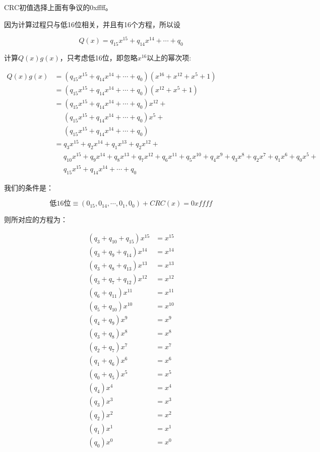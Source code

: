 \documentclass[
]{article}
\begin{document}
CRC初值选择上面有争议的0xffff。

因为计算过程只与低16位相关，并且有16个方程，所以设

\begin{equation}
Q(x)=q_{15}x^{15}+q_{14}x^{14}+\cdots+q_0
\end{equation}

计算$Q(x)g(x)$，只考虑低16位，即忽略$x^{16}以上的幂次项$:

\begin{equation}
\begin{aligned}
Q(x)g(x)&=(q_{15}x^{15}+q_{14}x^{14}+\cdots+q_0)(x^{16}+x^{12}+x^5+1)\\
&=(q_{15}x^{15}+q_{14}x^{14}+\cdots+q_0)(x^{12}+x^5+1)\\
&=(q_{15}x^{15}+q_{14}x^{14}+\cdots+q_0)x^{12} +\\
& \: \: \: \: \: \:(q_{15}x^{15}+q_{14}x^{14}+\cdots+q_0)x^5 +\\
& \: \: \: \: \: \:(q_{15}x^{15}+q_{14}x^{14}+\cdots+q_0)\\
&=q_3x^{15}+q_2x^{14}+q_1x^{13}+q_2x^{12}+\\
& \: \: \: \: \: \: q_{10}x^{15}+q_9x^{14}+q_8x^{13}+q_7x^{12}+q_6x^{11}+q_5x^{10}+q_4x^{9}+q_3x^{8}+q_2x^{7}+q_1x^{6}+q_0x^{5}+\\
& \: \: \: \: \: \: q_{15}x^{15}+q_{14}x^{14}+\cdots+q_0
\end{aligned}
\end{equation}

我们的条件是：

\begin{equation}
[Q(x)g(x)]低16位 \equiv (0_{15},0_{14},\cdots,0_1,0_0)+CRC(x)=0xffff
\end{equation}

则所对应的方程为：

\begin{equation}
\begin{aligned}
(q_{3}+q_{10}+q_{15})x^{15}&=x^{15}\\
(q_{3}+q_{ 9}+q_{14})x^{14}&=x^{14}\\
(q_{3}+q_{ 8}+q_{13})x^{13}&=x^{13}\\
(q_{3}+q_{ 7}+q_{12})x^{12}&=x^{12}\\
(      q_{ 6}+q_{11})x^{11}&=x^{11}\\
(      q_{ 5}+q_{10})x^{10}&=x^{10}\\
(      q_{ 4}+q_{ 9})x^{ 9}&=x^{ 9}\\
(      q_{ 3}+q_{ 8})x^{ 8}&=x^{ 8}\\
(      q_{ 2}+q_{ 7})x^{ 7}&=x^{ 7}\\
(      q_{ 1}+q_{ 6})x^{ 6}&=x^{ 6}\\
(      q_{ 0}+q_{ 5})x^{ 5}&=x^{ 5}\\
(             q_{ 4})x^{ 4}&=x^{ 4}\\
(             q_{ 3})x^{ 3}&=x^{ 3}\\
(             q_{ 2})x^{ 2}&=x^{ 2}\\
(             q_{ 1})x^{ 1}&=x^{ 1}\\
(             q_{ 0})x^{ 0}&=x^{ 0}\\
\end{aligned}
\end{equation}
\end{document}
